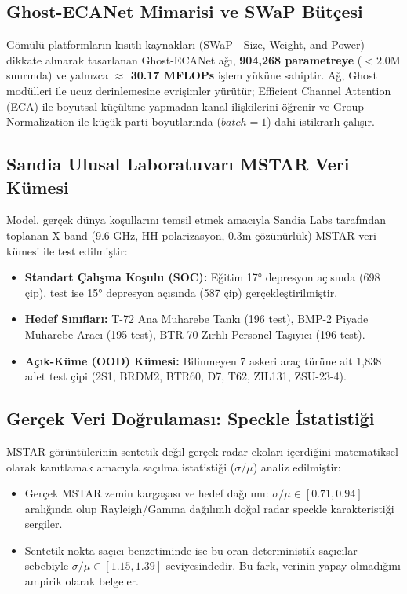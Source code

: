 \documentclass[11pt,a4paper]{article}
\begin{document}
\subsection{Ghost-ECANet Mimarisi ve SWaP Bütçesi}
Gömülü platformların kısıtlı kaynakları (SWaP - Size, Weight, and Power) dikkate alınarak tasarlanan Ghost-ECANet ağı, \textbf{904,268 parametreye} ($< 2.0\text{M}$ sınırında) ve yalnızca \textbf{$\approx$ 30.17 MFLOPs} işlem yüküne sahiptir. Ağ, Ghost modülleri ile ucuz derinlemesine evrişimler yürütür; Efficient Channel Attention (ECA) ile boyutsal küçültme yapmadan kanal ilişkilerini öğrenir ve Group Normalization ile küçük parti boyutlarında ($batch=1$) dahi istikrarlı çalışır.

\subsection{Sandia Ulusal Laboratuvarı MSTAR Veri Kümesi}
Model, gerçek dünya koşullarını temsil etmek amacıyla Sandia Labs tarafından toplanan X-band (9.6 GHz, HH polarizasyon, 0.3m çözünürlük) MSTAR veri kümesi ile test edilmiştir:
\begin{itemize}
    \item \textbf{Standart Çalışma Koşulu (SOC):} Eğitim 17° depresyon açısında (698 çip), test ise 15° depresyon açısında (587 çip) gerçekleştirilmiştir.
    \item \textbf{Hedef Sınıfları:} T-72 Ana Muharebe Tankı (196 test), BMP-2 Piyade Muharebe Aracı (195 test), BTR-70 Zırhlı Personel Taşıyıcı (196 test).
    \item \textbf{Açık-Küme (OOD) Kümesi:} Bilinmeyen 7 askeri araç türüne ait 1,838 adet test çipi (2S1, BRDM2, BTR60, D7, T62, ZIL131, ZSU-23-4).
\end{itemize}

\subsection{Gerçek Veri Doğrulaması: Speckle İstatistiği}
MSTAR görüntülerinin sentetik değil gerçek radar ekoları içerdiğini matematiksel olarak kanıtlamak amacıyla saçılma istatistiği ($\sigma / \mu$) analiz edilmiştir:
\begin{itemize}
    \item Gerçek MSTAR zemin kargaşası ve hedef dağılımı: $\sigma / \mu \in [0.71, 0.94]$ aralığında olup Rayleigh/\allowbreak Gamma dağılımlı doğal radar speckle karakteristiği sergiler.
    \item Sentetik nokta saçıcı benzetiminde ise bu oran deterministik saçıcılar sebebiyle $\sigma / \mu \in [1.15, 1.39]$ seviyesindedir. Bu fark, verinin yapay olmadığını ampirik olarak belgeler.
\end{itemize}
\end{document}
